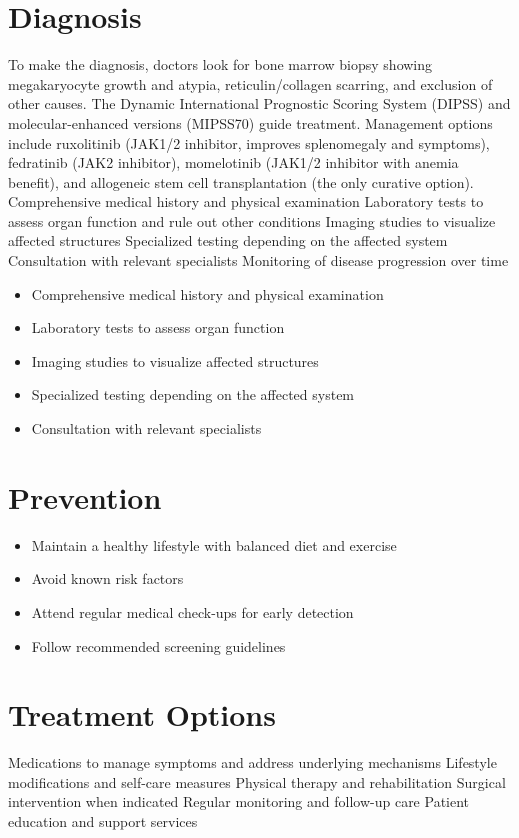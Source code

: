 \section{Diagnosis}
To make the diagnosis, doctors look for bone marrow biopsy showing megakaryocyte growth and atypia, reticulin/collagen scarring, and exclusion of other causes. The Dynamic International Prognostic Scoring System (DIPSS) and molecular-enhanced versions (MIPSS70) guide treatment. Management options include ruxolitinib (JAK1/2 inhibitor, improves splenomegaly and symptoms), fedratinib (JAK2 inhibitor), momelotinib (JAK1/2 inhibitor with anemia benefit), and allogeneic stem cell transplantation (the only curative option). Comprehensive medical history and physical examination Laboratory tests to assess organ function and rule out other conditions Imaging studies to visualize affected structures Specialized testing depending on the affected system Consultation with relevant specialists Monitoring of disease progression over time

\begin{itemize}[noitemsep]
  \item Comprehensive medical history and physical examination
  \item Laboratory tests to assess organ function
  \item Imaging studies to visualize affected structures
  \item Specialized testing depending on the affected system
  \item Consultation with relevant specialists
\end{itemize}
\section{Prevention}
\begin{itemize}[noitemsep]
  \item Maintain a healthy lifestyle with balanced diet and exercise
  \item Avoid known risk factors
  \item Attend regular medical check-ups for early detection
  \item Follow recommended screening guidelines
\end{itemize}
\section{Treatment Options}
Medications to manage symptoms and address underlying mechanisms Lifestyle modifications and self-care measures Physical therapy and rehabilitation Surgical intervention when indicated Regular monitoring and follow-up care Patient education and support services

